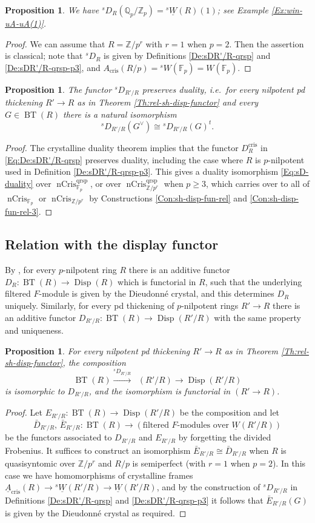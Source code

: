 \documentclass[a4paper,11pt]{amsart}
\theoremstyle{plain}
\newtheorem{Prop}[equation]{Proposition}
\theoremstyle{definition}
\theoremstyle{remark}
\newcommand{\bPr}{\begin{Prop}}
\newcommand{\ePr}{\end{Prop}}
\newcommand{\bproof}{\begin{proof}}
\newcommand{\eproof}{\end{proof}}
\newcommand{\beqn}{\begin{equation}}
\newcommand{\eeqn}{\end{equation}}
\renewcommand{\u}{\underline}
\numberwithin{equation}{section}
\newcommand{\FF}{{\mathbb{F}}}
\newcommand{\QQ}{{\mathbb{Q}}}
\newcommand{\ZZ}{{\mathbb{Z}}}
\DeclareMathOperator{\crys}{cris}
\DeclareMathOperator{\qrsp}{qrsp}
\DeclareMathOperator{\nCrys}{nCris}
\DeclareMathOperator{\BT}{BT}
\DeclareMathOperator{\Disp}{Disp}
\DeclareMathOperator{\sDisp}{{}^sDisp}
\newcommand{\sD}{{}^{s\!}D}
\newcommand{\sW}{{}^sW}
\newcommand{\usW}{{}^s\u W}
\begin{document}
\bPr
\label{Pr:sD-QpZp}
We have $\sD_R(\QQ_p/\ZZ_p)=\usW(R)(1)$;
see Example \ref{Ex:win-uA-uA(1)}.
\ePr

\bproof
We can assume that $R=\ZZ/p^r$ with $r=1$ when $p=2$. Then the assertion is classical; note that $\sD_R$ is given by Definitions \ref{De:sDR'/R-qrsp} and \ref{De:sDR'/R-qrsp-p3}, and $A_{\crys}(R/p)=\sW(\FF_p)=W(\FF_p)$.
\eproof


\bPr
The functor $\sD_{R'/R}$ preserves duality, i.e.\ for every nilpotent pd thickening $R'\to R$ as in Theorem \ref{Th:rel-sh-disp-functor} and every $G\in\BT(R)$ there is a natural isomorphism
\beqn
\label{Eq:sD-duality}
\sD_{R'/R}(G^\vee)\cong\sD_{R'/R}(G)^t.
\eeqn
\ePr

\bproof 
The crystalline duality theorem \cite[\S5.3]{BBM} implies that the functor $D_R^{\crys}$ in \eqref{Eq:De:sDR'/R-qrsp} preserves duality,
including the case where $R$ is $p$-nilpotent used in Definition \ref{De:sDR'/R-qrsp-p3}. This gives a duality isomorphism \eqref{Eq:sD-duality} over $\nCrys_{\FF_p}^{\qrsp}$, or over $\nCrys_{\ZZ/p^r}^{\qrsp}$ when $p\ge 3$, which carries over to all of $\nCrys_{\FF_p}$ or $\nCrys_{\ZZ/p^r}$ by Constructions \ref{Con:sh-disp-fun-rel} and \ref{Con:sh-disp-fun-rel-3}.
\eproof

\subsection{Relation with the display functor}

By \cite{Lau:Smoothness}, for every $p$-nilpotent ring $R$ there is an additive functor $D_R\colon\BT(R)\to\Disp(R)$ which is functorial in $R$, such that the underlying filtered $F$-module is given by the  Dieudonn\'e crystal, and this determines $D_R$ uniquely. Similarly, for every pd thickening of $p$-nilpotent rings $R'\to R$ there is an additive functor $D_{R'/R}\colon\BT(R)\to\Disp(R'/R)$ with the same property and uniqueness.

\bPr
\label{Pr:compare-sD-D-rel}
For every nilpotent pd thickening $R'\to R$ as in Theorem \ref{Th:rel-sh-disp-functor}, the composition
\[
\BT(R)\xrightarrow{\sD_{R'/R}}\sDisp(R'/R)\to\Disp(R'/R)
\]
is isomorphic to $D_{R'/R}$, and the isomorphism is functorial in $(R'\to R)$.
\ePr

\bproof
Let $E_{R'/R}\colon\BT(R)\to\Disp(R'/R)$ be the composition and let 
\[
\bar D_{R'/R},\,\bar E_{R'/R}\colon\BT(R)\to(\text{filtered $F$-modules over }\u W(R'/R))
\]
be the functors associated to $D_{R'/R}$ and $E_{R'/R}$ by forgetting the divided Frobenius. It suffices to construct an isomorphism $\bar E_{R'/R}\cong\bar D_{R'/R}$ when $R$ is quasisyntomic over $\ZZ/p^r$ and $R/p$ is semiperfect (with $r=1$ when $p=2$). In this case we have homomorphisms of crystalline frames $\u A_{\crys}(R)\to\usW(R'/R)\to\u W(R'/R)$, and by the construction of $\sD_{R'/R}$ in Definitions \ref{De:sDR'/R-qrsp} and \ref{De:sDR'/R-qrsp-p3} it follows that $\bar E_{R'/R}(G)$ is given by the Dieudonn\'e crystal as required.
\eproof
\end{document}
